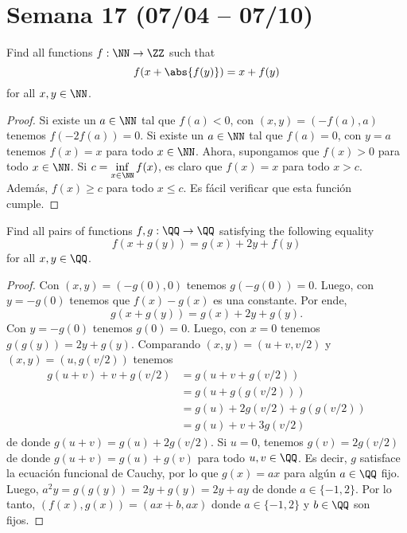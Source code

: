\section{Semana 17 (07/04 -- 07/10)}


\begin{probEG}[Azerbaijan]
  Find all functions $f:\NN\to\ZZ$ such that
  \[f(x+\abs{f(y)})=x+f(y)\]
  for all $x,y\in\NN$.
\end{probEG}

\begin{proof}
  Si existe un $a\in\NN$ tal que $f(a)<0$, con $(x,y)=(-f(a),a)$ tenemos
  $f(-2f(a))=0$. Si existe un $a\in\NN$ tal que $f(a)=0$, con $y=a$ tenemos
  $f(x)=x$ para todo $x\in\NN$. Ahora, supongamos que $f(x)>0$ para todo
  $x\in\NN$. Si $\displaystyle c=\inf_{x\in\NN}f(x)$, es claro que $f(x)=x$ para
  todo $x>c$. Además, $f(x)\ge c$ para todo $x\le c$. Es fácil verificar que
  esta función cumple.
\end{proof}

\begin{probEG}
  Find all pairs of functions $f,g:\QQ\to\QQ$ satisfying the following equality
  \[f(x+g(y))=g(x)+2y+f(y)\]
  for all $x,y\in\QQ$.
\end{probEG}

\begin{proof}
  Con $(x,y)=(-g(0),0)$ tenemos $g(-g(0))=0$. Luego, con $y=-g(0)$ tenemos que
  $f(x)-g(x)$ es una constante. Por ende,
  \[g(x+g(y))=g(x)+2y+g(y).\]
  Con $y=-g(0)$ tenemos $g(0)=0$. Luego, con $x=0$ tenemos $g(g(y))=2y+g(y)$.
  Comparando $(x,y)=(u+v,v/2)$ y $(x,y)=(u,g(v/2))$ tenemos
  \begin{align*}
    g(u+v)+v+g(v/2)
    &= g(u+v+g(v/2)) \\
    &= g(u+g(g(v/2))) \\
    &= g(u)+2g(v/2)+g(g(v/2)) \\
    &= g(u)+v+3g(v/2)
  \end{align*}
  de donde $g(u+v)=g(u)+2g(v/2)$. Si $u=0$, tenemos $g(v)=2g(v/2)$ de donde
  $g(u+v)=g(u)+g(v)$ para todo $u,v\in\QQ$. Es decir, $g$ satisface la ecuación
  funcional de Cauchy, por lo que $g(x)=ax$ para algún $a\in\QQ$ fijo. Luego,
  $a^2y=g(g(y))=2y+g(y)=2y+ay$ de donde $a\in\{-1,2\}$. Por lo tanto,
  $(f(x),g(x))=(ax+b,ax)$ donde $a\in\{-1,2\}$ y $b\in\QQ$ son fijos.
\end{proof}

